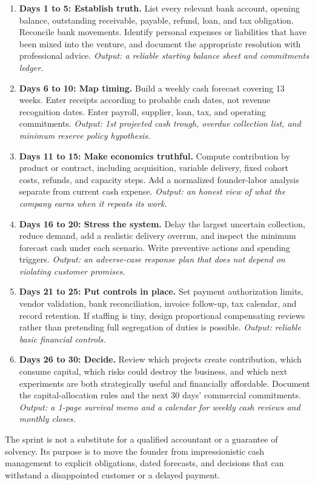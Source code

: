\begin{enumerate}
\item \textbf{Days 1 to 5: Establish truth.} List every relevant bank account, opening balance, outstanding receivable, payable, refund, loan, and tax obligation. Reconcile bank movements. Identify personal expenses or liabilities that have been mixed into the venture, and document the appropriate resolution with professional advice. \emph{Output: a reliable starting balance sheet and commitments ledger.}

\item \textbf{Days 6 to 10: Map timing.} Build a weekly cash forecast covering 13 weeks. Enter receipts according to probable cash dates, not revenue recognition dates. Enter payroll, supplier, loan, tax, and operating commitments. \emph{Output: 1st projected cash trough, overdue collection list, and minimum reserve policy hypothesis.}

\item \textbf{Days 11 to 15: Make economics truthful.} Compute contribution by product or contract, including acquisition, variable delivery, fixed cohort costs, refunds, and capacity steps. Add a normalized founder-labor analysis separate from current cash expense. \emph{Output: an honest view of what the company earns when it repeats its work.}

\item \textbf{Days 16 to 20: Stress the system.} Delay the largest uncertain collection, reduce demand, add a realistic delivery overrun, and inspect the minimum forecast cash under each scenario. Write preventive actions and spending triggers. \emph{Output: an adverse-case response plan that does not depend on violating customer promises.}

\item \textbf{Days 21 to 25: Put controls in place.} Set payment authorization limits, vendor validation, bank reconciliation, invoice follow-up, tax calendar, and record retention. If staffing is tiny, design proportional compensating reviews rather than pretending full segregation of duties is possible. \emph{Output: reliable basic financial controls.}

\item \textbf{Days 26 to 30: Decide.} Review which projects create contribution, which consume capital, which risks could destroy the business, and which next experiments are both strategically useful and financially affordable. Document the capital-allocation rules and the next 30 days' commercial commitments. \emph{Output: a 1-page survival memo and a calendar for weekly cash reviews and monthly closes.}
\end{enumerate}

The sprint is not a substitute for a qualified accountant or a guarantee of solvency. Its purpose is to move the founder from impressionistic cash management to explicit obligations, dated forecasts, and decisions that can withstand a disappointed customer or a delayed payment.
